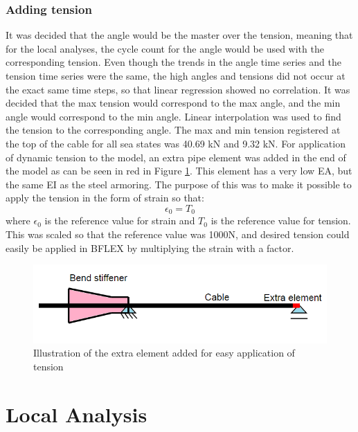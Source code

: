 \subsubsection{Adding tension}
\noindent  It was decided that the angle would be the master over the tension, meaning that for the local analyses, the cycle count for the angle would be used with the corresponding tension. Even though the trends in the angle time series and the tension time series were the same, the high angles and tensions did not occur at the exact same time steps, so that linear regression showed no correlation. It was decided that the max tension would correspond to the max angle, and the min angle would correspond to the min angle. Linear interpolation was used to find the tension to the corresponding angle. The max and min tension registered at the top of the cable for all sea states was 40.69 kN and 9.32 kN. \newline
\newline
For application of dynamic tension to the model, an extra pipe element was added in the end of the model as can be seen in red in Figure \ref{fig:exelem}. This element has a very low EA, but the same EI as the steel armoring. The purpose of this was to make it possible to apply the tension in the form of strain so that:
\begin{equation}
    \epsilon_0 = T_0
\end{equation}
where $\epsilon_0$ is the reference value for strain and $T_0$ is the reference value for tension. This was scaled so that the reference value was 1000N, and desired tension could easily be applied in BFLEX by multiplying the strain with a factor. 
\begin{figure}[H]
\centering
\includegraphics[scale=0.8]{figures/exelem}
\caption[Illustration of the extra element added for easy application of tension]{Illustration of the extra element added for easy application of tension}
 \label{fig:exelem}
\end{figure}

\section{Local Analysis}
